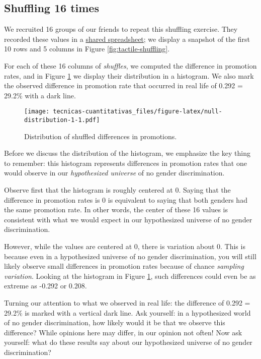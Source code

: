 \documentclass[
]{book}
\begin{document}
\hypertarget{shuffling-16-times}{%
\subsection{Shuffling 16 times}\label{shuffling-16-times}}

We recruited 16 groups of our friends to repeat this shuffling exercise. They recorded these values in a \href{https://docs.google.com/spreadsheets/d/1Q-ENy3o5IrpJshJ7gn3hJ5A0TOWV2AZrKNHMsshQtiE/}{shared spreadsheet}; we display a snapshot of the first 10 rows and 5 columns in Figure \ref{fig:tactile-shuffling}.

For each of these 16 columns of \emph{shuffles}, we computed the difference in promotion rates, and in Figure \ref{fig:null-distribution-1} we display their distribution in a histogram. We also mark the observed difference in promotion rate that occurred in real life of 0.292 = 29.2\% with a dark line.

\begin{figure}
\centering
\texttt{[image: tecnicas-cuantitativas\_files/figure-latex/null-distribution-1-1.pdf]}
\caption{\label{fig:null-distribution-1}Distribution of shuffled differences in promotions.}
\end{figure}

Before we discuss the distribution of the histogram, we emphasize the key thing to remember: this histogram represents differences in promotion rates that one would observe in our \emph{hypothesized universe} of no gender discrimination.

Observe first that the histogram is roughly centered at 0. Saying that the difference in promotion rates is 0 is equivalent to saying that both genders had the same promotion rate. In other words, the center of these 16 values is consistent with what we would expect in our hypothesized universe of no gender discrimination.

However, while the values are centered at 0, there is variation about 0. This is because even in a hypothesized universe of no gender discrimination, you will still likely observe small differences in promotion rates because of chance \emph{sampling variation}. Looking at the histogram in Figure \ref{fig:null-distribution-1}, such differences could even be as extreme as -0.292 or 0.208.

Turning our attention to what we observed in real life: the difference of 0.292 = 29.2\% is marked with a vertical dark line. Ask yourself: in a hypothesized world of no gender discrimination, how likely would it be that we observe this difference? While opinions here may differ, in our opinion not often! Now ask yourself: what do these results say about our hypothesized universe of no gender discrimination?
\end{document}
